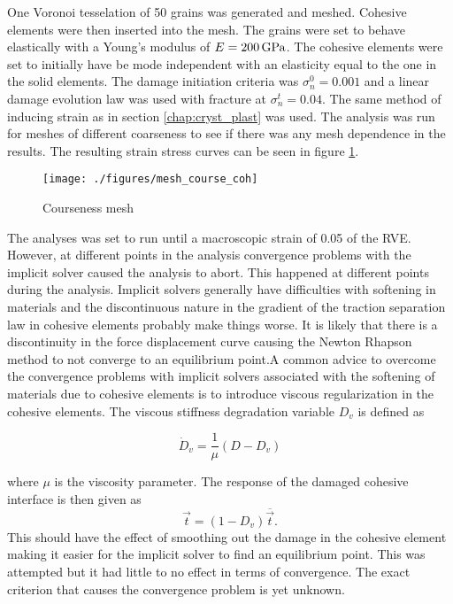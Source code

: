 \documentclass[grain_boundary_law.tex]{subfiles}
\begin{document}
One Voronoi tesselation of 50 grains was generated and meshed. Cohesive elements were then inserted into the mesh. The grains were set to behave elastically with a Young's modulus of $E = \unit[200]{GPa}$. The cohesive elements were set to initially have be mode independent with an elasticity equal to the one in the solid elements. The damage initiation criteria was $\sigma_n^0 = 0.001$ and a linear damage evolution law was used with fracture at $\sigma_n^t = 0.04$. The same method of inducing strain as in section \ref{chap:cryst_plast} was used. The analysis was run for meshes of different coarseness to see if there was any mesh dependence in the results. The resulting strain stress curves can be seen in figure \ref{fig:coarse_coh}.
%
%
\begin{figure}[htpb!]
\centering
\texttt{[image: ./figures/mesh\_course\_coh]}
\caption{Courseness mesh}
\label{fig:coarse_coh}
\end{figure}
%
 The analyses was set to run until a macroscopic strain of 0.05 of the RVE. However, at different points in the analysis convergence problems with the implicit solver caused the analysis to abort. This happened at different points during the analysis. Implicit solvers generally have difficulties with softening in materials and the discontinuous nature in the gradient of the traction separation law in cohesive elements probably make things worse. It is likely that there is a discontinuity in the force displacement curve causing the Newton Rhapson method to not converge to an equilibrium point.A common advice to overcome the convergence problems with implicit solvers associated with the softening of materials due to cohesive elements is to introduce viscous regularization in the cohesive elements. The viscous stiffness degradation variable $D_v$ is defined as
 
\begin{equation}
  \dot{D}_v = \frac{1}{\mu} (D - D_v)
\end{equation}

where $\mu$ is the viscosity parameter. The response of the damaged cohesive interface is then given as
%
\begin{equation}
  \vec{t} = (1 - D_v) \overline{\vec{t}}.
\end{equation}
%
This should have the effect of smoothing out the damage in the cohesive element making it easier for the implicit solver to find an equilibrium point. This was attempted but it had little to no effect in terms of convergence. The exact criterion that causes the convergence problem is yet unknown.
\end{document}
